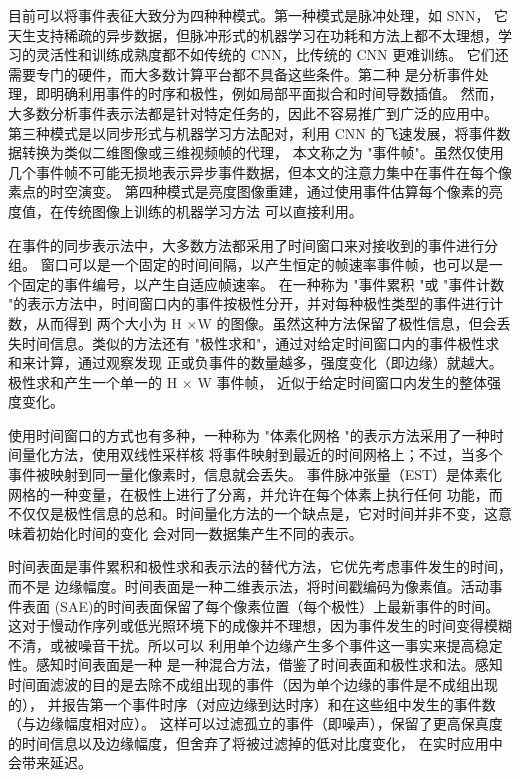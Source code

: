 目前可以将事件表征大致分为四种种模式。第一种模式是脉冲处理，如 SNN，
它天生支持稀疏的异步数据，但脉冲形式的机器学习在功耗和方法上都不太理想，学习的灵活性和训练成熟度都不如传统的 CNN，比传统的 CNN 更难训练。
它们还需要专门的硬件，而大多数计算平台都不具备这些条件。第二种
是分析事件处理，即明确利用事件的时序和极性，例如局部平面拟合和时间导数插值。
然而，大多数分析事件表示法都是针对特定任务的，因此不容易推广到广泛的应用中。
第三种模式是以同步形式与机器学习方法配对，利用 CNN 的飞速发展，将事件数据转换为类似二维图像或三维视频帧的代理，
本文称之为 "事件帧"。虽然仅使用几个事件帧不可能无损地表示异步事件数据，但本文的注意力集中在事件在每个像素点的时空演变。
第四种模式是亮度图像重建，通过使用事件估算每个像素的亮度值，在传统图像上训练的机器学习方法
可以直接利用。\cite{baldwin2022time}

在事件的同步表示法中，大多数方法都采用了时间窗口来对接收到的事件进行分组。
窗口可以是一个固定的时间间隔，以产生恒定的帧速率事件帧，也可以是一个固定的事件编号，以产生自适应帧速率。
在一种称为 "事件累积 "或 "事件计数 "的表示方法中，时间窗口内的事件按极性分开，并对每种极性类型的事件进行计数，从而得到
两个大小为 H ×W 的图像。虽然这种方法保留了极性信息，但会丢失时间信息。类似的方法还有 "极性求和"，通过对给定时间窗口内的事件极性求和来计算，通过观察发现
正或负事件的数量越多，强度变化（即边缘）就越大。极性求和产生一个单一的 H × W 事件帧，
近似于给定时间窗口内发生的整体强度变化。

使用时间窗口的方式也有多种，一种称为 "体素化网格 "的表示方法采用了一种时间量化方法，使用双线性采样核
将事件映射到最近的时间网格上；不过，当多个事件被映射到同一量化像素时，信息就会丢失。
事件脉冲张量（EST）是体素化网格的一种变量，在极性上进行了分离，并允许在每个体素上执行任何
功能，而不仅仅是极性信息的总和。时间量化方法的一个缺点是，它对时间并非不变，这意味着初始化时间的变化
会对同一数据集产生不同的表示。

时间表面是事件累积和极性求和表示法的替代方法\cite{benosman2013event}，它优先考虑事件发生的时间，而不是
边缘幅度。时间表面是一种二维表示法，将时间戳编码为像素值。活动事件表面
(SAE)的时间表面保留了每个像素位置（每个极性）上最新事件的时间。
这对于慢动作序列或低光照环境下的成像并不理想，因为事件发生的时间变得模糊不清，或被噪音干扰。所以可以
利用单个边缘产生多个事件这一事实来提高稳定性。感知时间表面是一种
是一种混合方法，借鉴了时间表面和极性求和法。感知时间面滤波的目的是去除不成组出现的事件（因为单个边缘的事件是不成组出现的），
并报告第一个事件时序（对应边缘到达时序）和在这些组中发生的事件数（与边缘幅度相对应）。
这样可以过滤孤立的事件（即噪声），保留了更高保真度的时间信息以及边缘幅度，但舍弃了将被过滤掉的低对比度变化，
在实时应用中会带来延迟。

